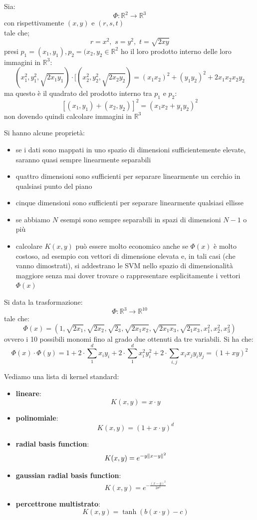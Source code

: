 \begin{esempio}
  Sia:
  \[\Phi:\mathbb{R}^2\to \mathbb{R}^3\]
  con rispettivamente $(x, y)$ e $(r, s, t)$\\
  tale che;
  \[r=x^2,\,\, s=y^2,\,\, t=\sqrt{2xy}\]
  presi $p_1=(x_1, y_1), p_2=(x_2, y_2\in\mathbb{R}^2$ ho il loro prodotto interno
  delle loro immagini in $\mathbb{R}^3$:
  \[(x_1^2, y_1^2,\sqrt{2x_1y_1})\cdot
    [(x_2^2, y_2^2,\sqrt{2x_2y_2})=(x_1x_2)^2+(y_1y_2)^2+2x_1x_2x_2y_2\]
  ma questo è il quadrato del prodotto interno tra $p_1$ e $p_2$:
  \[[(x_1, y_1)+(x_2, y_2)]^2=(x_1x_2+y_1y_2)^2\]
  non dovendo quindi calcolare immagini in $\mathbb{R}^3$
\end{esempio}
Si hanno alcune proprietà:
\begin{itemize}
  \item se i dati sono mappati in uno spazio di dimensioni sufficientemente
  elevate, saranno quasi sempre linearmente separabili
  \item quattro dimensioni sono sufficienti per separare linearmente un cerchio
  in qualsiasi punto del piano
  \item cinque dimensioni sono sufficienti per separare linearmente qualsiasi
  ellisse
  \item se abbiamo $N$ esempi sono sempre separabili in spazi di dimensioni
  $N-1$ o più
  \item calcolare $K(x, y)$ può essere molto economico anche se $\Phi(x)$ è molto
  costoso, ad esempio con vettori di dimensione elevata e, in tali casi (che
  vanno dimostrati), si
  addestrano le SVM nello spazio di dimensionalità maggiore senza mai dover
  trovare o rappresentare esplicitamente i vettori $\Phi(x)$
\end{itemize}
\begin{esempio}
  Si data la trasformazione:
  \[\Phi:\mathbb{R}^3\to \mathbb{R}^{10}\]
  tale che:
  \[\Phi(x)=(1,
    \sqrt{2x_1},\sqrt{2x_2},\sqrt{2_3},\sqrt{2x_1x_2},\sqrt{2x_1x_3},
    \sqrt{2_1x_3}, x_1^2, x_2^2, x_3^2)\]
  ovvero i 10 possibili monomi fino al grado due ottenuti da tre variabili. Si
  ha che:
  \[\Phi(x)\cdot\Phi(y)=1+2\cdot\sum_1^dx_iy_i+2\cdot\sum_1^dx_i^2y_i^2+2\cdot\sum_{i, j}
    x_ix_jy_iy_j=(1+xy)^2\]
  
\end{esempio}
Vediamo una lista di kernel standard:
\begin{itemize}
  \item \textbf{lineare}:
  \[K(x, y)=x\cdot y\]
  \item \textbf{polinomiale}:
  \[K(x, y)=(1+x\cdot y)^d\]
  \item \textbf{radial basis function}:
  \[K(x, y)=e^{-y\norm{x-y}^2}\]
  \item \textbf{gaussian radial basis function}:
  \[K(x, y)=e^{-\frac{(x-y)^2}{2\sigma^2}}\]
  \item \textbf{percettrone multistrato}:
  \[K(x, y)=\tanh (b(x\cdot y) -c)\]
\end{itemize}
